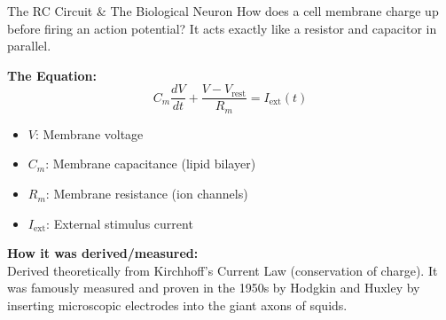 \begin{frame}{The RC Circuit \& The Biological Neuron}
How does a cell membrane charge up before firing an action potential? It acts exactly like a resistor and capacitor in parallel.

\vspace{0.5cm}
\textbf{The Equation:}
\[
C_m \frac{dV}{dt} + \frac{V - V_{\text{rest}}}{R_m} = I_{\text{ext}}(t)
\]

\begin{itemize}
    \item $V$: Membrane voltage
    \item $C_m$: Membrane capacitance (lipid bilayer)
    \item $R_m$: Membrane resistance (ion channels)
    \item $I_{\text{ext}}$: External stimulus current
\end{itemize}

\vspace{0.5cm}
\textbf{How it was derived/measured:} \\
Derived theoretically from Kirchhoff's Current Law (conservation of charge). It was famously measured and proven in the 1950s by Hodgkin and Huxley by inserting microscopic electrodes into the giant axons of squids.
\end{frame}
